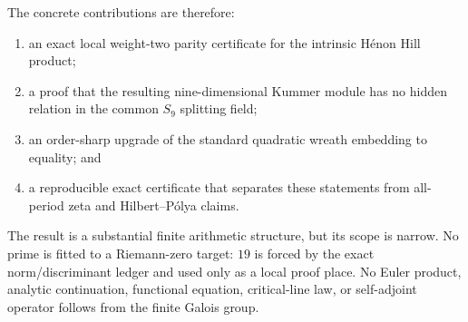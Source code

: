 The concrete contributions are therefore:

\begin{enumerate}[leftmargin=*,itemsep=2pt]
\item an exact local weight-two parity certificate for the intrinsic
      H\'enon Hill product;
\item a proof that the resulting nine-dimensional Kummer module has no
      hidden relation in the common \(S_9\) splitting field;
\item an order-sharp upgrade of the standard quadratic wreath embedding to
      equality; and
\item a reproducible exact certificate that separates these statements
      from all-period zeta and Hilbert--P\'olya claims.
\end{enumerate}

The result is a substantial finite arithmetic structure, but its scope is
narrow.  No prime is fitted to a Riemann-zero target: \(19\) is forced by
the exact norm/discriminant ledger and used only as a local proof place.
No Euler product, analytic continuation, functional equation, critical-line
law, or self-adjoint operator follows from the finite Galois group.
